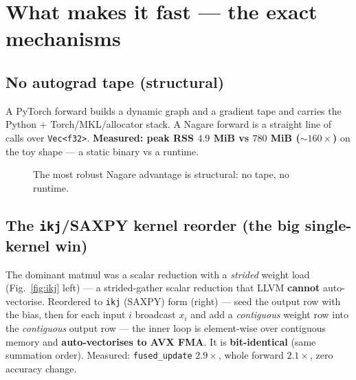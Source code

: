 \documentclass[11pt]{article}
\begin{document}
\section{What makes it fast --- the exact mechanisms}

\subsection{No autograd tape (structural)}
A PyTorch forward builds a dynamic graph and a gradient tape and carries the
Python + Torch/MKL/allocator stack. A Nagare forward is a straight line of calls
over \texttt{Vec<f32>}. \textbf{Measured: peak RSS $4.9$ MiB vs $780$ MiB
($\sim160\times$)} on the toy shape --- a static binary vs a runtime.

\begin{figure}[h]\centering
{}
\caption{The most robust Nagare advantage is structural: no tape, no runtime.}
\end{figure}

\subsection{The \texttt{ikj}/SAXPY kernel reorder (the big single-kernel win)}
The dominant matmul was a scalar reduction with a \emph{strided} weight load
(Fig.~\ref{fig:ikj} left) --- a strided-gather scalar reduction that LLVM
\textbf{cannot} auto-vectorise. Reordered to \texttt{ikj} (SAXPY) form
(right) --- seed the output row with the bias, then for each input $i$ broadcast
$x_i$ and add a \emph{contiguous} weight row into the \emph{contiguous} output
row --- the inner loop is element-wise over contiguous memory and
\textbf{auto-vectorises to AVX FMA}. It is \textbf{bit-identical} (same summation
order). Measured: \texttt{fused\_update} $\mathbf{2.9\times}$, whole forward
$\mathbf{2.1\times}$, zero accuracy change.
\end{document}

